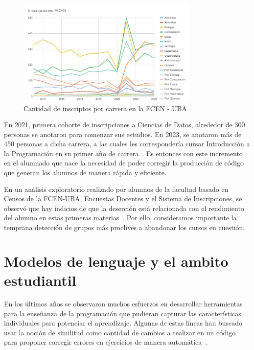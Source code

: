 \documentclass[11pt,a4paper,twoside,openany]{tesis}
\begin{document}
\begin{figure}[H]
    \centering
    \includegraphics[width=0.8\textwidth]{imagenes/inscriptos-por-carrera.jpg}
    \caption{Cantidad de inscriptos por carrera en la FCEN - UBA ~\cite{DOV}}
    \label{grafico-dov}
\end{figure}

En 2021, primera cohorte de inscripciones a Ciencias de Datos, alrededor de 300 personas se anotaron para comenzar sus estudios. En 2023, se anotaron más de 450 personas a dicha carrera, a las cuales les correspondería cursar Introducción a la Programación en su primer año de carrera~\cite{primeros-datos}. Es entonces con este incremento en el alumnado que nace la necesidad de poder corregir la producción de código que generan los alumnos de manera rápida y eficiente. 

En un análisis exploratorio realizado por alumnos de la facultad basado en Censos de la FCEN-UBA, Encuestas Docentes y el Sistema de Inscripciones, se observó que hay indicios de que la deserción está relacionada con el rendimiento del alumno en estas primeras materias~\cite{analisis-exploratorio}. Por ello, consideramos importante la temprana detección de grupos más proclives a abandonar los cursos en cuestión. 

\section{Modelos de lenguaje y el ambito estudiantil}

En los últimos años se observaron muchos esfuerzos en desarrollar herramientas para la enseñanza de la programación que pudieran capturar las características individuales para potenciar el aprendizaje. Algunas de estas líneas han buscado usar la noción de similitud como cantidad de cambios a realizar en un código para proponer corregir errores en ejercicios de manera automática~\cite{gulwani2018automated}.
\end{document}
